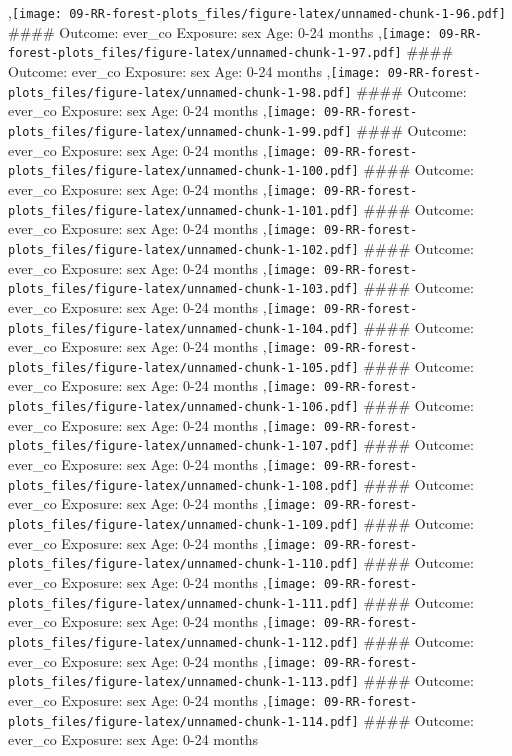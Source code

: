 \documentclass[
  9pt,
]{book}
\begin{document}
,\texttt{[image: 09-RR-forest-plots\_files/figure-latex/unnamed-chunk-1-96.pdf]}
\#\#\#\# Outcome: ever\_co Exposure: sex Age: 0-24 months
,\texttt{[image: 09-RR-forest-plots\_files/figure-latex/unnamed-chunk-1-97.pdf]}
\#\#\#\# Outcome: ever\_co Exposure: sex Age: 0-24 months
,\texttt{[image: 09-RR-forest-plots\_files/figure-latex/unnamed-chunk-1-98.pdf]}
\#\#\#\# Outcome: ever\_co Exposure: sex Age: 0-24 months
,\texttt{[image: 09-RR-forest-plots\_files/figure-latex/unnamed-chunk-1-99.pdf]}
\#\#\#\# Outcome: ever\_co Exposure: sex Age: 0-24 months
,\texttt{[image: 09-RR-forest-plots\_files/figure-latex/unnamed-chunk-1-100.pdf]}
\#\#\#\# Outcome: ever\_co Exposure: sex Age: 0-24 months
,\texttt{[image: 09-RR-forest-plots\_files/figure-latex/unnamed-chunk-1-101.pdf]}
\#\#\#\# Outcome: ever\_co Exposure: sex Age: 0-24 months
,\texttt{[image: 09-RR-forest-plots\_files/figure-latex/unnamed-chunk-1-102.pdf]}
\#\#\#\# Outcome: ever\_co Exposure: sex Age: 0-24 months
,\texttt{[image: 09-RR-forest-plots\_files/figure-latex/unnamed-chunk-1-103.pdf]}
\#\#\#\# Outcome: ever\_co Exposure: sex Age: 0-24 months
,\texttt{[image: 09-RR-forest-plots\_files/figure-latex/unnamed-chunk-1-104.pdf]}
\#\#\#\# Outcome: ever\_co Exposure: sex Age: 0-24 months
,\texttt{[image: 09-RR-forest-plots\_files/figure-latex/unnamed-chunk-1-105.pdf]}
\#\#\#\# Outcome: ever\_co Exposure: sex Age: 0-24 months
,\texttt{[image: 09-RR-forest-plots\_files/figure-latex/unnamed-chunk-1-106.pdf]}
\#\#\#\# Outcome: ever\_co Exposure: sex Age: 0-24 months
,\texttt{[image: 09-RR-forest-plots\_files/figure-latex/unnamed-chunk-1-107.pdf]}
\#\#\#\# Outcome: ever\_co Exposure: sex Age: 0-24 months
,\texttt{[image: 09-RR-forest-plots\_files/figure-latex/unnamed-chunk-1-108.pdf]}
\#\#\#\# Outcome: ever\_co Exposure: sex Age: 0-24 months
,\texttt{[image: 09-RR-forest-plots\_files/figure-latex/unnamed-chunk-1-109.pdf]}
\#\#\#\# Outcome: ever\_co Exposure: sex Age: 0-24 months
,\texttt{[image: 09-RR-forest-plots\_files/figure-latex/unnamed-chunk-1-110.pdf]}
\#\#\#\# Outcome: ever\_co Exposure: sex Age: 0-24 months
,\texttt{[image: 09-RR-forest-plots\_files/figure-latex/unnamed-chunk-1-111.pdf]}
\#\#\#\# Outcome: ever\_co Exposure: sex Age: 0-24 months
,\texttt{[image: 09-RR-forest-plots\_files/figure-latex/unnamed-chunk-1-112.pdf]}
\#\#\#\# Outcome: ever\_co Exposure: sex Age: 0-24 months
,\texttt{[image: 09-RR-forest-plots\_files/figure-latex/unnamed-chunk-1-113.pdf]}
\#\#\#\# Outcome: ever\_co Exposure: sex Age: 0-24 months
,\texttt{[image: 09-RR-forest-plots\_files/figure-latex/unnamed-chunk-1-114.pdf]}
\#\#\#\# Outcome: ever\_co Exposure: sex Age: 0-24 months
\end{document}
